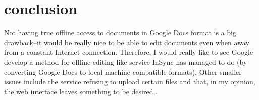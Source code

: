 \documentclass[10pt,]{article}
\begin{document}
\section{conclusion}
Not having true offline access to documents in Google Docs format is a big drawback–it would be really nice to be able to edit documents even when away from a constant Internet connection. Therefore, I would really like to see Google develop a method for offline editing like service InSync has managed to do (by converting Google Docs to local machine compatible formats). Other smaller issues include the service refusing to upload certain files and that, in my opinion, the web interface leaves something to be desired.\cite{s11}.


   
\end{document}
